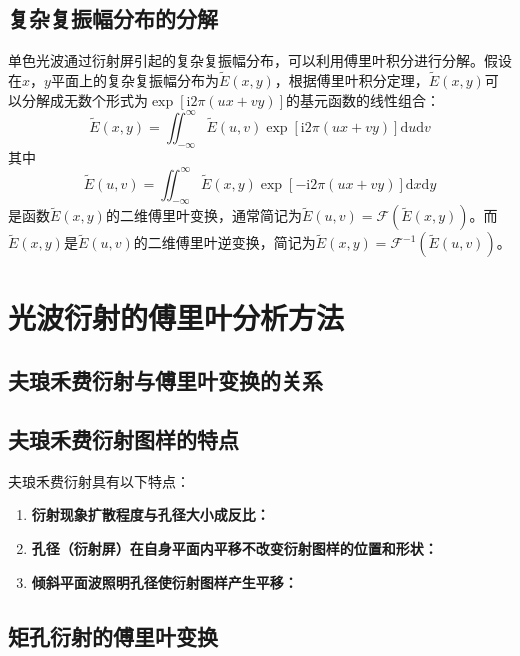 \documentclass[cn,10pt,chinesefont=founder,math=mtpro2,cite=super,toc=onecol,twoside,openany]{elegantbook}
\begin{document}
\subsection{复杂复振幅分布的分解}

单色光波通过衍射屏引起的复杂复振幅分布，可以利用傅里叶积分进行分解。假设在$x$，$y$平面上的复杂复振幅分布为$\tilde{E}(x,y)$，根据傅里叶积分定理，$\tilde{E}(x,y)$可以分解成无数个形式为$\exp[\mathrm{i}2\pi(ux+vy)]$的基元函数的线性组合：
\begin{equation}
\tilde{E}(x,y)=\iint_{-\infty}^{\infty}\tilde{E}(u,v)\exp[\mathrm{i}2\pi(ux+vy)]\mathrm{d}u\mathrm{d}v
\end{equation}
其中
\begin{equation}
\tilde{E}(u,v)=\iint_{-\infty}^{\infty}\tilde{E}(x,y)\exp[-\mathrm{i}2\pi(ux+vy)]\mathrm{d}x\mathrm{d}y
\end{equation}
是函数$\tilde{E}(x,y)$的二维傅里叶变换，通常简记为$\tilde{E}(u,v)=\mathscr{F}(\tilde{E}(x,y))$。而$\tilde{E}(x,y)$是$\tilde{E}(u,v)$的二维傅里叶逆变换，简记为$\tilde{E}(x,y)=\mathscr{F}^{-1}(\tilde{E}(u,v))$。

\section{光波衍射的傅里叶分析方法}

\subsection{夫琅禾费衍射与傅里叶变换的关系}

\subsection{夫琅禾费衍射图样的特点}
夫琅禾费衍射具有以下特点：
\begin{enumerate}
	\item \textbf{衍射现象扩散程度与孔径大小成反比：}
	\item \textbf{孔径（衍射屏）在自身平面内平移不改变衍射图样的位置和形状：}
	\item \textbf{倾斜平面波照明孔径使衍射图样产生平移：}
\end{enumerate}

\subsection{矩孔衍射的傅里叶变换}
\end{document}

